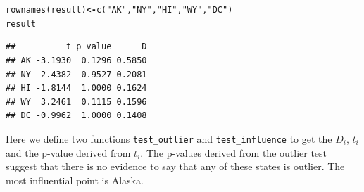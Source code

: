 \documentclass[12pt,oneside,a4paper]{article}\usepackage[]{graphicx}\usepackage[]{xcolor}
\makeatletter
\newcommand{\hlstr}[1]{\textcolor[rgb]{0,0,1}{#1}}%
\newcommand{\hlstd}[1]{\textcolor[rgb]{0,0,0}{#1}}%
\newcommand{\hlkwb}[1]{\textcolor[rgb]{0.498,0,0.333}{\textbf{#1}}}%
\newcommand{\hlkwd}[1]{\textcolor[rgb]{0,0,0}{#1}}%
\newenvironment{kframe}{%
 \def\at@end@of@kframe{}%
 \ifinner\ifhmode%
  \def\at@end@of@kframe{\end{minipage}}%
  \begin{minipage}{\columnwidth}%
 \fi\fi%
 \def\FrameCommand##1{\hskip\@totalleftmargin \hskip-\fboxsep
 \colorbox{shadecolor}{##1}\hskip-\fboxsep
     \hskip-\linewidth \hskip-\@totalleftmargin \hskip\columnwidth}%
 \MakeFramed {\advance\hsize-\width
   \@totalleftmargin\z@ \linewidth\hsize
   \@setminipage}}%
 {\par\unskip\endMakeFramed%
 \at@end@of@kframe}
\newenvironment{knitrout}{}{} %
\newcommand{\m}[1]{\texttt{{#1}}}
\makeatother
\begin{document}
\begin{knitrout}
\begin{kframe}
\begin{alltt}
\hlkwd{rownames}\hlstd{(result)} \hlkwb{<-} \hlkwd{c}\hlstd{(}\hlstr{"AK"}\hlstd{,} \hlstr{"NY"}\hlstd{,} \hlstr{"HI"}\hlstd{,} \hlstr{"WY"}\hlstd{,} \hlstr{"DC"}\hlstd{)}
\hlstd{result}
\end{alltt}
\begin{verbatim}
##          t p_value      D
## AK -3.1930  0.1296 0.5850
## NY -2.4382  0.9527 0.2081
## HI -1.8144  1.0000 0.1624
## WY  3.2461  0.1115 0.1596
## DC -0.9962  1.0000 0.1408
\end{verbatim}
\end{kframe}
\end{knitrout}

Here we define two functions \m{test\_outlier} and \m{test\_influence} to get the $D_{i}$, $t_{i}$ and the p-value derived from $t_{i}$. The p-values derived from the outlier test suggest that there is no evidence to say that any of these states is outlier. The most influential point is Alaska.
\end{document}
